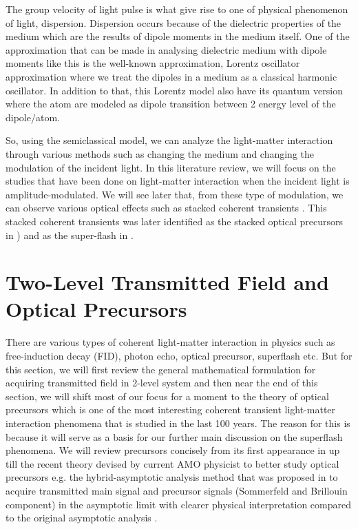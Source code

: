 The group velocity of light pulse is what give rise to one of physical phenomenon of light, dispersion. Dispersion occurs because of the dielectric properties of the medium which are the results of dipole moments in the medium itself. One of the approximation that can be made in analysing dielectric medium with dipole moments like this is the well-known approximation, Lorentz oscillator approximation where we treat the dipoles in a medium as a classical harmonic oscillator. In addition to that, this Lorentz model also have its quantum version where the atom are modeled as dipole transition between 2 energy level of the dipole/atom.

So, using the semiclassical model, we can analyze the light-matter interaction through various methods such as changing the medium and changing the modulation of the incident light. In this literature review, we will focus on the studies that have been done on light-matter interaction when the incident light is amplitude-modulated. We will see later that, from these type of modulation, we can observe various optical effects such as stacked coherent transients \cite{Segard_1987}. This stacked coherent transients was later identified as the stacked optical precursors in ) and as the super-flash in .


\section{Two-Level Transmitted Field and Optical Precursors}
There are various types of coherent light-matter interaction in physics such as free-induction decay (FID), photon echo, optical precursor, superflash etc. But for this section, we will first review the general mathematical formulation for acquiring transmitted field in 2-level system and then near the end of this section, we will shift most of our focus for a moment to the theory of optical precursors which is one of the most interesting coherent transient light-matter interaction phenomena that is studied in the last 100 years. The reason for this is because it will serve as a basis for our further main discussion on the superflash phenomena. We will review precursors concisely from its first appearance in  up till the recent theory devised by current AMO physicist to better study optical precursors e.g. the hybrid-asymptotic analysis method that was proposed in  to acquire transmitted main signal and precursor signals (Sommerfeld and Brillouin component) in the asymptotic limit with clearer physical interpretation compared to the original asymptotic analysis \cite{Sherman1981}.

